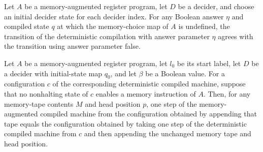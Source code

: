 \begin{lemma}
\label{Complexity.LogProg.detM_tr}
\leanok
{}
Let $A$ be a memory-augmented register program, let $D$ be a decider, and choose an
initial decider state for each decider index. For any Boolean answer $\eta$ and compiled
state $q$ at which the memory-choice map of $A$ is undefined, the transition of the
deterministic compilation with answer parameter $\eta$ agrees with the transition using
answer parameter false.
\end{lemma}

\begin{lemma}
\label{Complexity.LogProg.mcompileTM_step}
\leanok
{}
Let $A$ be a memory-augmented register program, let $l_0$ be its start label, let $D$ be
a decider with initial-state map $q_0$, and let $\beta$ be a Boolean value. For a
configuration $c$ of the corresponding deterministic compiled machine, suppose that no
nonhalting state of $c$ enables a memory instruction of $A$. Then, for any memory-tape
contents $M$ and head position $p$, one step of the memory-augmented compiled machine
from the configuration obtained by appending that tape equals the configuration obtained
by taking one step of the deterministic compiled machine from $c$ and then appending the
unchanged memory tape and head position.
\end{lemma}

